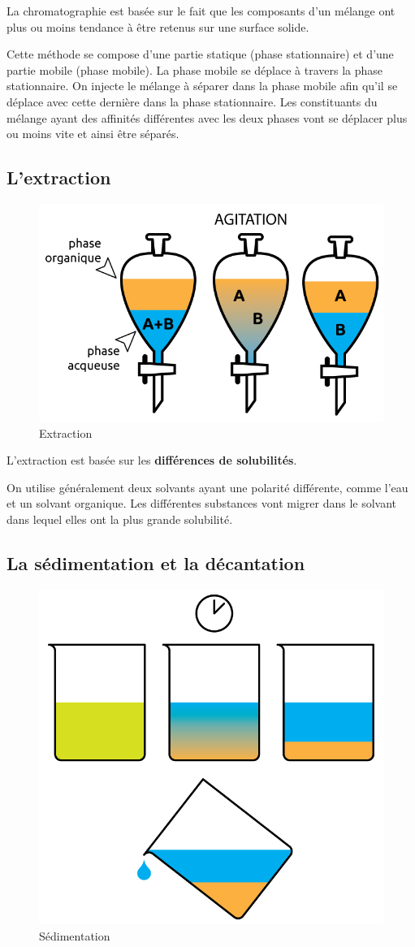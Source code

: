 \documentclass[
  11pt,
  french,
  a4paper,
  openany]{book}
\begin{document}
La chromatographie est basée sur le fait que les composants d'un mélange ont plus ou moins tendance à être retenus sur une surface solide.

Cette méthode se compose d'une partie statique (phase stationnaire) et d'une partie mobile (phase mobile). La phase mobile se déplace à travers la phase stationnaire. On injecte le mélange à séparer dans la phase mobile afin qu'il se déplace avec cette dernière dans la phase stationnaire. Les constituants du mélange ayant des affinités différentes avec les deux phases vont se déplacer plus ou moins vite et ainsi être séparés.

\hypertarget{lextraction}{%
\subsection{L'extraction}\label{lextraction}}

\begin{figure}

{\centering \includegraphics[width=0.45\linewidth]{images/extraction} 

}

\caption{Extraction}\label{fig:extraction}
\end{figure}

L'extraction est basée sur les \textbf{différences de solubilités}.

On utilise généralement deux solvants ayant une polarité différente, comme l'eau et un solvant organique. Les différentes substances vont migrer dans le solvant dans lequel elles ont la plus grande solubilité.

\newpage

\hypertarget{la-suxe9dimentation-et-la-duxe9cantation}{%
\subsection{La sédimentation et la décantation}\label{la-suxe9dimentation-et-la-duxe9cantation}}

\begin{figure}

{\centering \includegraphics[width=0.33\linewidth]{images/sedimentation} 

}

\caption{Sédimentation}\label{fig:sedimentation}
\end{figure}
\end{document}

